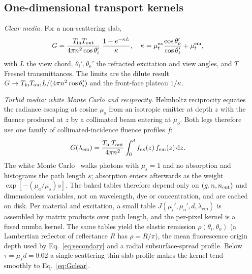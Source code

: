 \documentclass[journal]{IEEEtran}
\newcommand{\mua}{\mu_a}
\newcommand{\mus}{\mu_s}
\newcommand{\mut}{\mu_t}
\newcommand{\lem}{\lambda_{\mathrm{em}}}
\begin{document}
\subsection{One-dimensional transport kernels}
\emph{Clear media.} For a non-scattering slab,
\begin{equation}
G=\frac{T_{\rm in}T_{\rm out}}{4\pi n^2\cos\theta_i'}\;\frac{1-e^{-\kappa L}}{\kappa},\quad \kappa=\mut^{\rm ex}\frac{\cos\theta_o'}{\cos\theta_i'}+\mut^{\rm em},
\label{eq:Gclear}
\end{equation}
with $L$ the view chord, $\theta_i',\theta_o'$ the refracted excitation and view angles, and $T$ Fresnel transmittances. The limits are the dilute result $G\to T_{\rm in}T_{\rm out}L/(4\pi n^2\cos\theta_i')$ and the front-face plateau $1/\kappa$.

\emph{Turbid media: white Monte Carlo and reciprocity.} Helmholtz reciprocity equates the radiance escaping at cosine $\mu_o$ from an isotropic emitter at depth $z$ with the fluence produced at $z$ by a collimated beam entering at $\mu_o$. Both legs therefore use one family of collimated-incidence fluence profiles $f$:
\begin{equation}
G(\lem)=\frac{T_{\rm in}T_{\rm out}}{4\pi n^2}\int_0^{d} f_{\rm ex}(z)\,f_{\rm em}(z)\,\mathrm dz .
\label{eq:Gturbid}
\end{equation}
The white Monte Carlo~\cite{alerstam2008white} walks photons with $\mus=1$ and no absorption and histograms the path length $s$; absorption enters afterwards as the weight $\exp[-(\mua/\mus)s]$. The baked tables therefore depend only on $(g,n,n_{\rm out})$ and dimensionless variables, not on wavelength, dye or concentration, and are cached on disk. Per material and excitation, a small table $J(\mu_i',\mu_o',d,\lem)$ is assembled by matrix products over path length, and the per-pixel kernel is a fused numba kernel. The same tables yield the elastic remission $\rho(\theta_i,\theta_o)$ (a Lambertian reflector of reflectance $R$ has $\rho=R/\pi$), the mean fluorescence origin depth used by Eq.~\eqref{eq:secondary} and a radial subsurface-spread profile. Below $\tau=\mus d=0.02$ a single-scattering thin-slab profile makes the kernel tend smoothly to Eq.~\eqref{eq:Gclear}.
\end{document}
